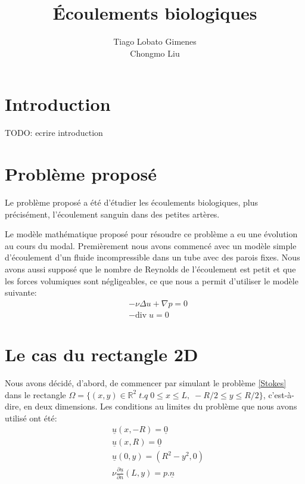 \documentclass[11pt,a4paper]{article}
\title{Écoulements biologiques}
\author{Tiago Lobato Gimenes \\ Chongmo Liu}
\numberwithin{equation}{subsection}
\numberwithin{figure}{subsection}
\begin{document}
\maketitle

%
%
\section*{Introduction}

TODO: ecrire introduction

%
%
\section{Problème proposé}

Le problème proposé a été d'étudier les écoulements biologiques, plus précisément, l'écoulement sanguin dans des petites artères.
 
Le modèle mathématique proposé pour résoudre ce problème a eu une évolution au cours du modal. Premièrement nous avons commencé avec un modèle simple d'écoulement d'un fluide incompressible dans un tube avec des parois fixes. Nous avons aussi supposé que le nombre de Reynolds de  l'écoulement est petit et que les forces volumiques sont négligeables, ce que nous a permit d'utiliser le modèle suivante:
\begin{equation}
\begin{aligned}
& -\nu \Delta u + \nabla p = 0 \\
& -\mathrm{div}\;u = 0 \label{Stokes}
\end{aligned}
\end{equation}

\section{Le cas du rectangle 2D}
Nous avons décidé, d'abord, de commencer par simulant le problème \ref{Stokes} dans le rectangle $\Omega = \{(x,y) \in \mathbb{R}^2 \;t.q\; 0 \leq x \leq L, \; -R/2 \leq y \leq R/2\}$, c'est-à-dire, en deux dimensions. Les conditions au limites du problème que nous avons utilisé ont été:
\begin{equation}
\begin{aligned}
& \underline{u}(x,-R) = \underline{0} \\
& \underline{u}(x, R) = \underline{0} \\
& \underline{u}(0,y) = \left(R^2 - y^2, 0\right) \\
& \nu\frac{\partial\underline{u}}{\partial n}(L,y) = p.\underline{n}
\end{aligned} \label{LimitesClassiques}
\end{equation}
\end{document}
